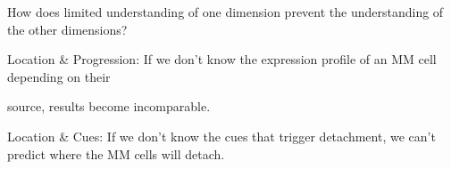 %
\label{sec:discussion_conclusion_cancer}%



How does limited understanding of one dimension prevent the understanding of the
other dimensions?

Location \& Progression: If we don't know the expression profile of an MM cell
depending on their

source, results become incomparable.

Location \& Cues: If we don't know the cues that trigger detachment, we can't
predict where the MM cells will detach.



